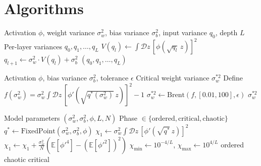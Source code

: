 \documentclass[10pt]{article}
\newcommand{\EE}{\mathbb{E}}
\begin{document}
\section{Algorithms}
\label{app:algorithms}

\begin{algorithm}[H]
\caption{Variance Map Computation}
\label{alg:variance-map}
\begin{algorithmic}[1]
\Require Activation $\phi$, weight variance $\sigma_w^2$, bias variance $\sigma_b^2$, input variance $q_0$, depth $L$
\Ensure Per-layer variances $q_0, q_1, \ldots, q_L$
    \State $V(q_l) \gets \int \mathcal{D}z\, [\phi(\sqrt{q_l}\, z)]^2$ 
    \State $q_{l+1} \gets \sigma_w^2 \cdot V(q_l) + \sigma_b^2$
\EndFor
\State \Return $(q_0, q_1, \ldots, q_L)$
\end{algorithmic}
\end{algorithm}

\begin{algorithm}[H]
\caption{Edge-of-Chaos Solver}
\label{alg:eoc-solver}
\begin{algorithmic}[1]
\Require Activation $\phi$, bias variance $\sigma_b^2$, tolerance $\epsilon$
\Ensure Critical weight variance $\sigma_w^{*2}$
\State Define $f(\sigma_w^2) = \sigma_w^2 \int \mathcal{D}z\, [\phi'(\sqrt{q^*(\sigma_w^2)}\, z)]^2 - 1$
\State $\sigma_w^{*2} \gets \text{Brent}(f, [0.01, 100], \epsilon)$
\State \Return $\sigma_w^{*2}$
\end{algorithmic}
\end{algorithm}

\begin{algorithm}[H]
\caption{Depth-Calibrated Phase Classification}
\label{alg:classify}
\begin{algorithmic}[1]
\Require Model parameters $(\sigma_w^2, \sigma_b^2, \phi, L, N)$
\Ensure Phase $\in \{\text{ordered}, \text{critical}, \text{chaotic}\}$
\State $q^* \gets \text{FixedPoint}(\sigma_w^2, \sigma_b^2, \phi)$
\State $\chi_1 \gets \sigma_w^2 \int \mathcal{D}z\, [\phi'(\sqrt{q^*}\, z)]^2$
    \State $\chi_1 \gets \chi_1 + \frac{\sigma_w^2}{N}(\EE[\phi'^4] - (\EE[\phi'^2])^2)$ 
\EndIf
\State $\chi_{\min} \gets 10^{-4/L}$, \quad $\chi_{\max} \gets 10^{4/L}$ 
    \State \Return ordered
    \State \Return chaotic
\Else
    \State \Return critical
\EndIf
\end{algorithmic}
\end{algorithm}
\end{document}
